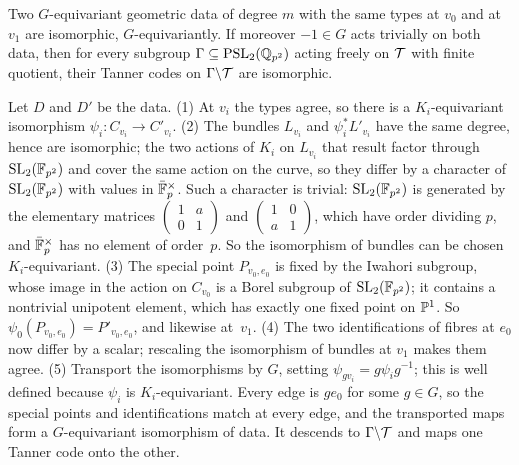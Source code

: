 \begin{lemma}[Rigidity]\label{lem:rigid}
\notformalized
Two $G$-equivariant geometric data of degree $m$ with the same types at $v_0$ and at $v_1$ are isomorphic,
$G$-equivariantly. If moreover $-1\in G$ acts trivially on both data, then for every subgroup
$\Gamma\subseteq\operatorname{PSL}_2(\mathbb{Q}_{p^2})$ acting freely on $\mathcal{T}$ with finite quotient, their Tanner codes on $\Gamma\backslash\mathcal{T}$
are isomorphic.
\end{lemma}
\begin{informalproof}
Let $D$ and $D'$ be the data. (1) At $v_i$ the types agree, so there is a $K_i$-equivariant isomorphism
$\psi_i\colon C_{v_i}\to C'_{v_i}$. (2) The bundles $L_{v_i}$ and $\psi_i^*L'_{v_i}$ have the same degree, hence are
isomorphic; the two actions of $K_i$ on $L_{v_i}$ that result factor through $\operatorname{SL}_2(\mathbb{F}_{p^2})$ and cover the same action on
the curve, so they differ by a character of $\operatorname{SL}_2(\mathbb{F}_{p^2})$ with values in $\bar{\mathbb{F}}_p^\times$. Such a character is trivial:
$\operatorname{SL}_2(\mathbb{F}_{p^2})$ is generated by the elementary matrices $(\begin{smallmatrix}1&a\\0&1\end{smallmatrix})$ and
$(\begin{smallmatrix}1&0\\a&1\end{smallmatrix})$, which have order dividing $p$, and $\bar{\mathbb{F}}_p^\times$ has no element of
order~$p$. So the isomorphism of bundles can be chosen $K_i$-equivariant. (3) The special
point $P_{v_0,e_0}$ is fixed by the Iwahori subgroup, whose image in the action on $C_{v_0}$ is a Borel subgroup of
$\operatorname{SL}_2(\mathbb{F}_{p^2})$; it contains a nontrivial unipotent element, which has exactly one fixed point on $\mathbb{P}^1$. So
$\psi_0(P_{v_0,e_0})=P'_{v_0,e_0}$, and likewise at~$v_1$. (4) The two identifications of fibres at $e_0$ now differ by a
scalar; rescaling the isomorphism of bundles at $v_1$ makes them agree. (5) Transport the isomorphisms by $G$, setting
$\psi_{gv_i}=g\psi_ig^{-1}$; this is well defined because $\psi_i$ is $K_i$-equivariant. Every edge is $ge_0$ for some
$g\in G$, so the special points and identifications match at every edge, and the transported maps form a $G$-equivariant
isomorphism of data. It descends to $\Gamma\backslash\mathcal{T}$ and maps one Tanner code onto the other.
\end{informalproof}

